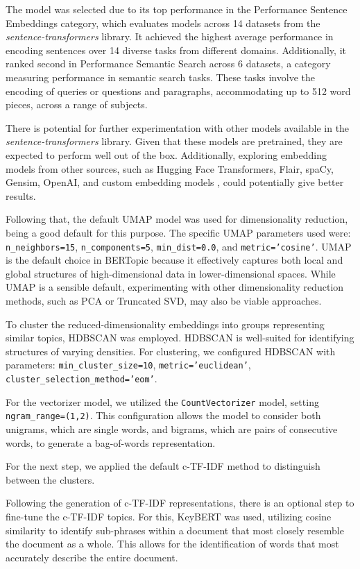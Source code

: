 \documentclass{article}
\begin{document}
The model was selected due to its top performance in the Performance Sentence Embeddings category, which evaluates models across 14 datasets from the \textit{sentence-transformers} library. It achieved the highest average performance in encoding sentences over 14 diverse tasks from different domains. Additionally, it ranked second in Performance Semantic Search across 6 datasets, a category measuring performance in semantic search tasks. These tasks involve the encoding of queries or questions and paragraphs, accommodating up to 512 word pieces, across a range of subjects.

There is potential for further experimentation with other models available in the \textit{sentence-transformers} library. Given that these models are pretrained, they are expected to perform well out of the box. Additionally, exploring embedding models from other sources, such as Hugging Face Transformers, Flair, spaCy, Gensim, OpenAI, and custom embedding models \cite{grootendorst_1_nodate}, could potentially give better results.

Following that, the default UMAP model was used for dimensionality reduction, being a good default for this purpose. The specific UMAP parameters used were: \texttt{n\_neighbors=15}, \texttt{n\_components=5}, \texttt{min\_dist=0.0}, and \texttt{metric='cosine'}. UMAP is the default choice in BERTopic because it effectively captures both local and global structures of high-dimensional data in lower-dimensional spaces. While UMAP is a sensible default, experimenting with other dimensionality reduction methods, such as PCA or Truncated SVD, may also be viable approaches.


To cluster the reduced-dimensionality embeddings into groups representing similar topics, HDBSCAN was employed. HDBSCAN is well-suited for identifying structures of varying densities. For clustering, we configured HDBSCAN with parameters: \texttt{min\_cluster\_size=10}, \texttt{metric='euclidean'}, \texttt{cluster\_selection\_method='eom'}.

For the vectorizer model, we utilized the \texttt{CountVectorizer} model, setting \texttt{ngram\_range=(1,2)}. This configuration allows the model to consider both unigrams, which are single words, and bigrams, which are pairs of consecutive words, to generate a bag-of-words representation.

For the next step, we applied the default c-TF-IDF method to distinguish between the clusters.

Following the generation of c-TF-IDF representations, there is an optional step to fine-tune the c-TF-IDF topics. For this, KeyBERT was used, utilizing cosine similarity to identify sub-phrases within a document that most closely resemble the document as a whole. This allows for the identification of words that most accurately describe the entire document.
\end{document}
